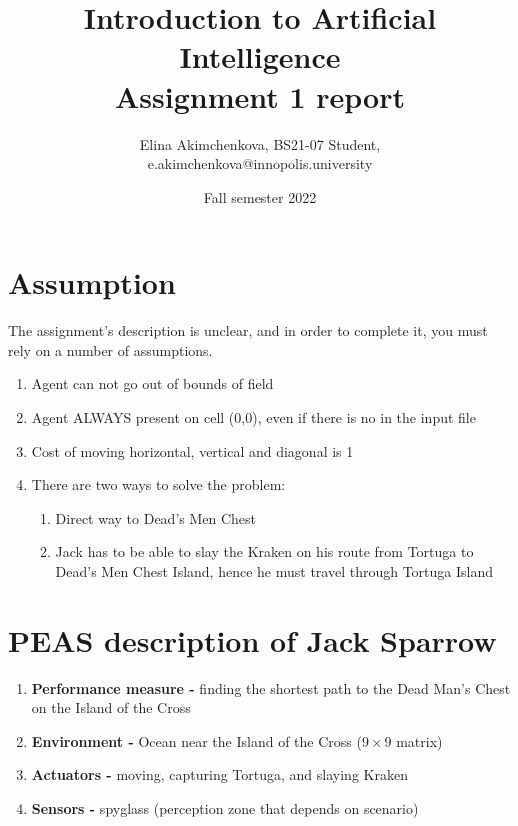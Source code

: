 \documentclass[a4paper,12pt]{article}
\begin{document}
\title{Introduction to Artificial Intelligence\\
Assignment 1 report}
\author{Elina Akimchenkova, BS21-07 Student,\\
e.akimchenkova@innopolis.university}
\date{Fall semester 2022}
\maketitle

\section{Assumption}
The assignment's description is unclear, and in order to complete it, you must rely on a number of assumptions.
\begin{enumerate}
    \item Agent can not go out of bounds of field
    \item Agent ALWAYS present on cell (0,0), even if there is no in the input file
    \item Cost of moving horizontal, vertical and diagonal is 1
    \item There are two ways to solve the problem:
    \begin{enumerate}
        \item Direct way to Dead’s Men Chest
        \item Jack has to be able to slay the Kraken on his route from Tortuga to Dead's Men Chest Island, hence he must travel through Tortuga Island
    \end{enumerate}
\end{enumerate}

\section{PEAS description of Jack Sparrow}
\begin{enumerate}
    \item \textbf{Performance measure -} finding the shortest path to the Dead Man’s Chest on the Island of the Cross
    \item \textbf{Environment -} Ocean near the Island of the Cross (\(9\times 9\) matrix)
    \item \textbf{Actuators -} moving, capturing Tortuga, and slaying Kraken
    \item \textbf{Sensors -} spyglass (perception zone that depends on scenario)
\end{enumerate}
\end{document}
